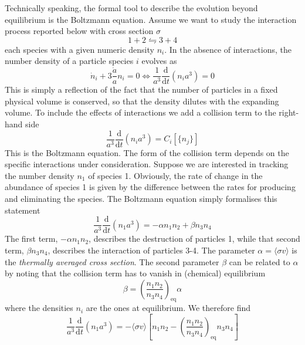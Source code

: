 Technically speaking, the formal tool to describe the evolution beyond equilibrium is the Boltzmann equation. Assume we want to study the interaction process reported below with cross section $\sigma$
\begin{equation}
    1 + 2 \leftrightharpoons 3 + 4
\end{equation}
each species with a given numeric density $n_{i}$. In the absence of interactions, the number density of a particle species $i$ evolves as
\begin{equation}
    \dot{n}_{i} + 3\frac{\dot{a}}{a}n_{i} = 0 \iff \frac{1}{a^{3}}\frac{\text{d}}{\text{d}t}(n_{i}a^{3}) = 0
\end{equation}
This is simply a reflection of the fact that the number of particles in a fixed physical volume is conserved, so that the density dilutes with the expanding volume. To include the effects of interactions we add a collision term to the right-hand side
\begin{equation}
    \frac{1}{a^{3}}\frac{\text{d}}{\text{d}t}(n_{i}a^{3}) = C_{i}[\{n_{j}\}]
\end{equation}
This is the Boltzmann equation. The form of the collision term depends on the specific interactions under consideration. Suppose we are interested in tracking the number density $n_{1}$ of species 1. Obviously, the rate of change in the abundance of species 1 is given by the difference between the rates for producing and eliminating the species. The Boltzmann equation simply formalises this statement
\begin{equation}
    \frac{1}{a^{3}}\frac{\text{d}}{\text{d}t}(n_{1}a^{3}) = -\alpha n_{1}n_{2} + \beta n_{3}n_{4}
\end{equation}
The first term, $-\alpha n_{1}n_{2}$, describes the destruction of particles 1, while that second term, $\beta n_{3}n_{4}$, describes the interaction of particles 3-4. The parameter $\alpha = \langle \sigma v \rangle$ is the \emph{thermally averaged cross section}. The second parameter $\beta$ can be related to $\alpha$ by noting that the collision term has to vanish in (chemical) equilibrium
\begin{equation}
    \beta = \left(\frac{n_{1}n_{2}}{n_{3}n_{4}}\right)_{\text{eq}}\alpha
\end{equation}
where the densities $n_{i}$ are the ones at equilibrium. We therefore find
\begin{equation}
    \boxed{
    \frac{1}{a^{3}}\frac{\text{d}}{\text{d}t}(n_{1}a^{3}) = -\langle \sigma v \rangle\left[n_{1}n_{2}-\left(\frac{n_{1}n_{2}}{n_{3}n_{4}}\right)_{\text{eq}}n_{3}n_{4}\right]
    }
    \label{eq:Boltmann-eq}
\end{equation}
